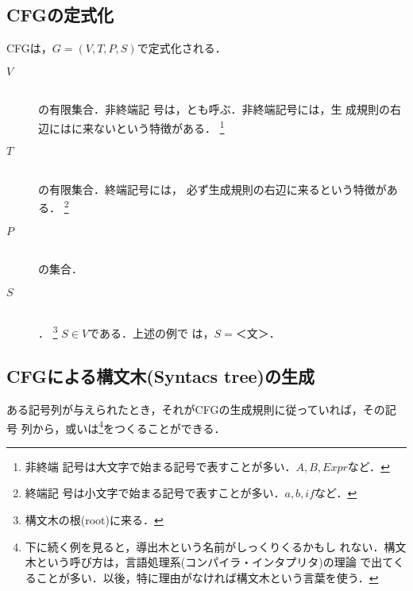 \subsection{CFGの定式化}
CFGは，$G = (V, T, P, S)$で定式化される．
\begin{description}
 \item[$V$] \mbox{} \\
            の有限集合．非終端記
            号は，とも呼ぶ．非終端記号には，生
            成規則の右辺にはに来ないという特徴がある． \footnote{非終端
            記号は大文字で始まる記号で表すことが多い．$A, B, Expr$など．}

 \item[$T$] \mbox{} \\
            の有限集合．終端記号には，
            必ず生成規則の右辺に来るという特徴がある． \footnote{終端記
            号は小文字で始まる記号で表すことが多い．$a, b, if$など．}
 \item[$P$] \mbox{} \\
            の集合．
 \item[$S$] \mbox{} \\
            ．
            \footnote{構文木の根(root)に来る．}
            $S \in V$である．上述の例で
            は，$S = ＜文＞$．
\end{description}

\subsection{CFGによる構文木(Syntacs tree)の生成}
ある記号列が与えられたとき，それがCFGの生成規則に従っていれば，その記号
列から，或いは\footnote{下に続く例を見ると，導出木という名前がしっくりくるかもし
れない．構文木という呼び方は，言語処理系(コンパイラ・インタプリタ)の理論
で出てくることが多い．以後，特に理由がなければ構文木という言葉を使う．}をつくることができる．

